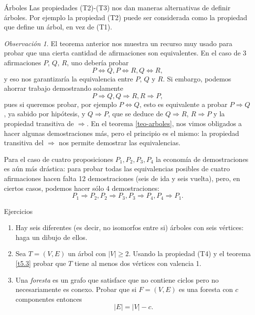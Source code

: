 \documentclass[11pt,spanish,makeidx]{amsbook}
\theoremstyle{definition}
\theoremstyle{remark}
\newtheorem{observacion}{Observaci\'on}[section]
\begin{document}
\begin{section}{Árboles}
Las propiedades (T2)-(T3) nos dan maneras alternativas de definir árboles. Por ejemplo la propiedad (T2) puede ser considerada como la propiedad que define un árbol, en vez de (T1).  

\begin{observacion}
El teorema anterior nos muestra un recurso muy usado para probar que una cierta cantidad de afirmaciones son equivalentes. En el caso de 3 afirmaciones $P$, $Q$, $R$, uno debería probar
$$
P \Leftrightarrow Q, P \Leftrightarrow R, Q \Leftrightarrow R,
$$
y eso nos garantizaría la equivalencia entre $P$, $Q$ y $R$. Si embargo, podemos ahorrar trabajo demostrando solamente
$$
P \Rightarrow Q, Q \Rightarrow R, R \Rightarrow P,
$$  
pues si queremos probar, por ejemplo $P \Leftrightarrow Q$, esto es equivalente a probar $P \Rightarrow Q$, ya sabido por hipótesis, y $Q \Rightarrow P$, que se deduce de $Q \Rightarrow R$, $R \Rightarrow P$ y la propiedad transitiva de $\Rightarrow$. En el teorema \ref{teo-arboles}, nos vimos obligados a hacer algunas demostraciones más, pero  el principio es el mismo: la propiedad transitiva del $\Rightarrow$ nos permite demostrar las equivalencias. 

Para el caso de cuatro proposiciones $P_1,P_2,P_3,P_4$ la economía de demostraciones es aún más drástica: para probar todas las equivalencias posibles de cuatro afirmaciones hacen falta 12 demostraciones (seis de ida y seis vuelta), pero, en ciertos casos, podemos hacer sólo 4 demostraciones:
$$
P_1 \Rightarrow P_2, P_2 \Rightarrow P_3, P_3 \Rightarrow P_4, P_4 \Rightarrow P_1. 
$$ 
\end{observacion}

\begin{subsection}{Ejercicios}\label{ejercicios5.5}
\begin{enumerate}
\item \label{ejercicio5.5.1} Hay seis diferentes (es decir, no isomorfos entre si) árboles con seis vértices: haga un dibujo de ellos.
\item Sea $T=(V,E)$ un árbol con $|V| \ge 2$. Usando la propiedad (T4) y el teorema \ref{t5.3} probar que $T$ tiene al menos dos vértices con valencia 1.
\item Una {\em foresta} es un grafo que satisface que no contiene ciclos pero no necesariamente es conexo. Probar que si $F=(V,E)$ es una foresta con $c$ componentes entonces
$$
|E|=|V|-c.
$$
\end{enumerate}
\end{subsection}

\end{section}
\end{document}
